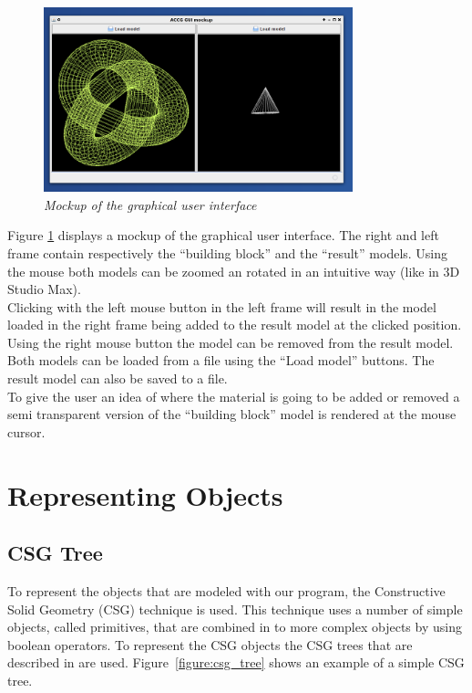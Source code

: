 \documentclass[a4paper,10pt,twoside]{report}
\begin{document}
\begin{figure}[h]
\centering
\includegraphics[width = 0.8\textwidth]{../resources/gui_mockup/1}
\caption{\emph{Mockup of the graphical user interface}} \label{gui_mockup}
\end{figure}

Figure \ref{gui_mockup} displays a mockup of the graphical user interface. The right and left frame contain respectively the ``building block'' and the ``result'' models. Using the mouse both models can be zoomed an rotated in an intuitive way (like in 3D Studio Max).\\

Clicking with the left mouse button in the left frame will result in the model loaded in the right frame being added to the result model at the clicked position. Using the right mouse button the model can be removed from the result model. \\

Both models can be loaded from a file using the ``Load model'' buttons. The result model can also be saved to a file. \\

To give the user an idea of where the material is going to be added or removed a semi transparent version of the ``building block'' model is rendered at the mouse cursor.\\

\chapter{Representing Objects}

\section{CSG Tree}
    To represent the objects that are modeled with our program, the Constructive Solid Geometry (CSG) technique is used. This technique uses a number of simple objects, called primitives, that are combined in to more complex objects by using boolean operators. To represent the CSG objects the CSG trees that are described in \cite{Wiegand96} are used. Figure~\ref{figure:csg_tree} shows an example of a simple CSG tree.\\
\end{document}
